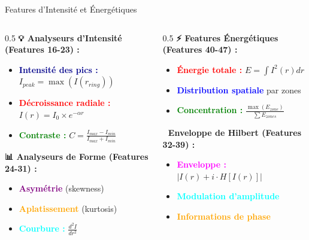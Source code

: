 \documentclass[aspectratio=169]{beamer}
\begin{document}
\begin{frame}{Features d'Intensité et Énergétiques}
    \begin{columns}
        \begin{column}{0.5\textwidth}
            \textbf{💡 Analyseurs d'Intensité (Features 16-23) :}
            \begin{itemize}
                \item \textcolor{darkblue}{\textbf{Intensité des pics :}} $I_{peak} = \max(I(r_{ring}))$
                \item \textcolor{red}{\textbf{Décroissance radiale :}} $I(r) = I_0 \times e^{-\alpha r}$
                \item \textcolor{green}{\textbf{Contraste :}} $C = \frac{I_{max} - I_{min}}{I_{max} + I_{min}}$
            \end{itemize}

            \vspace{0.3cm}
            \textbf{📊 Analyseurs de Forme (Features 24-31) :}
            \begin{itemize}
                \item \textcolor{purple}{\textbf{Asymétrie}} (skewness)
                \item \textcolor{orange}{\textbf{Aplatissement}} (kurtosis)
                \item \textcolor{cyan}{\textbf{Courbure :}} $\frac{d^2I}{dr^2}$
            \end{itemize}
        \end{column}
        \begin{column}{0.5\textwidth}
            \textbf{⚡ Features Énergétiques (Features 40-47) :}
            \begin{itemize}
                \item \textcolor{red}{\textbf{Énergie totale :}} $E = \int I^2(r) dr$
                \item \textcolor{blue}{\textbf{Distribution spatiale}} par zones
                \item \textcolor{green}{\textbf{Concentration :}} $\frac{\max(E_{zone})}{\sum E_{zones}}$
            \end{itemize}

            \vspace{0.3cm}
            \textbf{🎵 Enveloppe de Hilbert (Features 32-39) :}
            \begin{itemize}
                \item \textcolor{magenta}{\textbf{Enveloppe :}} $|I(r) + i \cdot H[I(r)]|$
                \item \textcolor{cyan}{\textbf{Modulation d'amplitude}}
                \item \textcolor{orange}{\textbf{Informations de phase}}
            \end{itemize}
        \end{column}
    \end{columns}
\end{frame}
\end{document}
